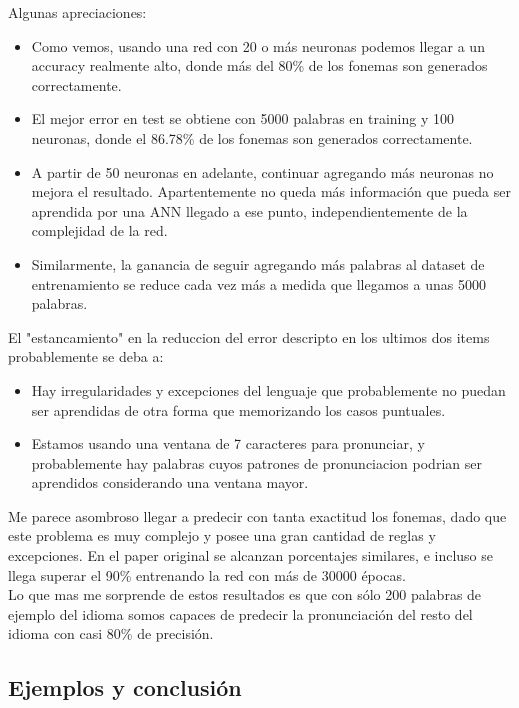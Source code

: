 \documentclass[paper=a4, fontsize=11pt]{scrartcl} %
\numberwithin{equation}{section} %
\numberwithin{figure}{section} %
\numberwithin{table}{section} %
\begin{document}
Algunas apreciaciones:

\begin{itemize}
\item Como vemos, usando una red con 20 o más neuronas podemos llegar a un accuracy realmente alto, donde más del 80\% de los fonemas son generados correctamente.
\item El mejor error en test se obtiene con 5000 palabras en training y 100 neuronas, donde el 86.78\% de los fonemas son generados correctamente.
\item A partir de 50 neuronas en adelante, continuar agregando más neuronas no mejora el resultado. Apartentemente no queda más información que pueda ser aprendida por una ANN llegado a ese punto, independientemente de la complejidad de la red.
\item Similarmente, la ganancia de seguir agregando más palabras al dataset de entrenamiento se reduce cada vez más a medida que llegamos a unas 5000 palabras. 
\end{itemize}

El "estancamiento" en la reduccion del error descripto en los ultimos dos items probablemente se deba a:

\begin{itemize}
\item Hay irregularidades y excepciones del lenguaje que probablemente no puedan ser aprendidas de otra forma que memorizando los casos puntuales.
\item Estamos usando una ventana de 7 caracteres para pronunciar, y probablemente hay palabras cuyos patrones de pronunciacion podrian ser aprendidos considerando una ventana mayor.
\end{itemize}


Me parece asombroso llegar a predecir con tanta exactitud los fonemas, dado que este problema es muy complejo y posee una gran cantidad de reglas y excepciones. En el paper original se alcanzan porcentajes similares, e incluso se llega superar el 90\% entrenando la red con más de 30000 épocas.\\

Lo que mas me sorprende de estos resultados es que con sólo 200 palabras de ejemplo del idioma somos capaces de predecir la pronunciación del resto del idioma con casi 80\% de precisión. \\


\subsection{Ejemplos y conclusión}
\end{document}
